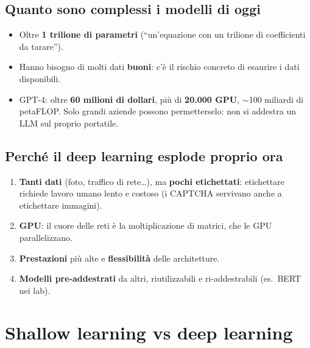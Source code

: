 \subsection{Quanto sono complessi i modelli di oggi}
\begin{itemize}
  \item Oltre \textbf{1 trilione di parametri} (``un'equazione con un trilione di coefficienti da tarare'').
  \item Hanno bisogno di molti dati \textbf{buoni}: c'è il rischio concreto di esaurire i dati disponibili.
  \item GPT-4: oltre \textbf{60 milioni di dollari}, più di \textbf{20.000 GPU}, $\sim$100 miliardi di petaFLOP.
        Solo grandi aziende possono permetterselo: non si addestra un LLM sul proprio portatile.
\end{itemize}

\subsection{Perché il deep learning esplode proprio ora}
\begin{enumerate}
  \item \textbf{Tanti dati} (foto, traffico di rete\ldots), ma \textbf{pochi etichettati}: etichettare
        richiede lavoro umano lento e costoso (i CAPTCHA servivano anche a etichettare immagini).
  \item \textbf{GPU}: il cuore delle reti è la moltiplicazione di matrici, che le GPU parallelizzano.
  \item \textbf{Prestazioni} più alte e \textbf{flessibilità} delle architetture.
  \item \textbf{Modelli pre-addestrati} da altri, riutilizzabili e ri-addestrabili (es.\ BERT nei lab).
\end{enumerate}

\section{Shallow learning vs deep learning}

